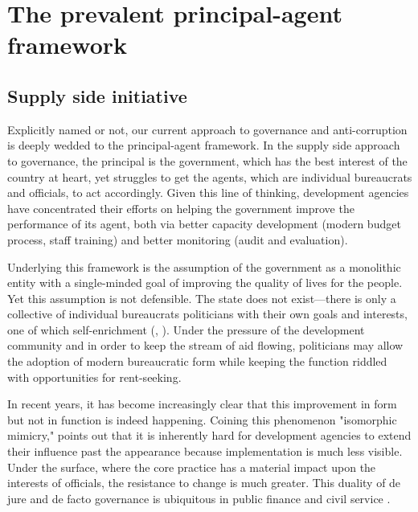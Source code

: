 \documentclass[12pt]{article}
\begin{document}
\begin{figure}
\begin{center}
\end{center}
\end{figure}

\section{The prevalent principal-agent framework}
\label{sec:principalagent}

\subsection{Supply side initiative}
\label{sec:supplyside}
Explicitly named or not, our current approach to governance and anti-corruption is deeply wedded to the principal-agent framework. In the supply side approach to governance, the principal is the government, which has the best interest of the country at heart, yet struggles to get the agents, which are individual bureaucrats and officials, to act accordingly. Given this line of thinking, development agencies have concentrated their efforts on helping the government improve the performance of its agent, both via better capacity development (modern budget process, staff training) and better monitoring  (audit and evaluation).

Underlying this framework is the assumption of the government as a monolithic entity with a single-minded goal of improving the quality of lives for the people. Yet this assumption is not defensible. The state does not exist---there is only a collective of individual bureaucrats politicians with their own goals and interests, one of which self-enrichment (\citealp{Booth2012}, \citealp{Shleifer2002}). Under the pressure of the development community and in order to keep the stream of aid flowing, politicians may allow the adoption of modern bureaucratic form while keeping the function riddled with opportunities for rent-seeking.

In recent years, it has become increasingly clear that this improvement in form but not in function is indeed happening.  Coining this phenomenon "isomorphic mimicry," \citet{Andrews2010} points out that it is inherently hard for development agencies to extend their influence past the appearance because implementation is much less visible. Under the surface, where the core practice has a material impact upon the interests of officials, the resistance to change is much greater. This duality of de jure and de facto governance is ubiquitous in public finance and civil service \citep[8-9]{Andrews2009}.
\end{document}
